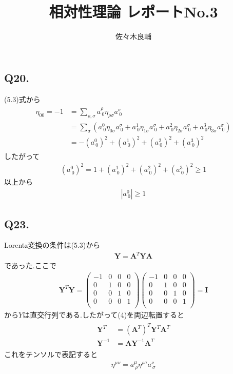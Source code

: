 \documentclass[uplatex,a4j,11pt,dvipdfmx]{jsarticle}
\begin{document}
\title{相対性理論 レポートNo.3}
\author{佐々木良輔}
\date{}
\maketitle
\subsection*{Q20.}
(5.3)式から
\begin{align}
  \begin{split}
    \eta_{00}=-1&=\sum_{\rho,\sigma}a^\rho_{\ 0}\eta_{\rho\sigma}a^\sigma_{\ 0}\\
    &=\sum_\sigma\left(a^0_{\ 0}\eta_{0\sigma}a^\sigma_{\ 0}+
    a^1_{\ 0}\eta_{1\sigma}a^\sigma_{\ 0}+
    a^2_{\ 0}\eta_{2\sigma}a^\sigma_{\ 0}+
    a^3_{\ 0}\eta_{3\sigma}a^\sigma_{\ 0}
    \right)\\
    &=-(a^0_{\ 0})^2+(a^1_{\ 0})^2+(a^2_{\ 0})^2+(a^3_{\ 0})^2
  \end{split} 
\end{align}
したがって
\begin{align}
  (a^0_{\ 0})^2=1+(a^1_{\ 0})^2+(a^2_{\ 0})^2+(a^3_{\ 0})^2\geq 1
\end{align}
以上から
\begin{align}
  |a^0_{\ 0}|\geq 1
\end{align}
\subsection*{Q23.}
Lorentz変換の条件は(5.3)から
\begin{align}
  {\bm Y}=\bm{A}^T\bm{YA}
\end{align}
であった.ここで
\begin{align}
  \bm{Y}^T\bm{Y}=\left(\begin{array}{cccc}
    -1 & 0 & 0 & 0\\
    0 & 1 & 0 & 0\\
    0 & 0 & 1 & 0\\
    0 & 0 & 0 & 1\\
  \end{array}\right)
  \left(\begin{array}{cccc}
    -1 & 0 & 0 & 0\\
    0 & 1 & 0 & 0\\
    0 & 0 & 1 & 0\\
    0 & 0 & 0 & 1\\
  \end{array}\right)
  ={\bm I}
\end{align}
から$Y$は直交行列である.したがって(4)を両辺転置すると
\begin{align}
  \begin{split}
    \bm{Y}^T&=({\bm A}^T)^T{\bm Y}^T{\bm A}^T\\
    \bm{Y}^{-1}&=\bm{A}\bm{Y}^{-1}\bm{A}^T
  \end{split}
\end{align}
これをテンソルで表記すると
\begin{align}
  \eta^{\mu\nu}=a^\mu_{\ \rho}\eta^{\rho\sigma}a^\nu_{\ \sigma}
\end{align}
\end{document}
